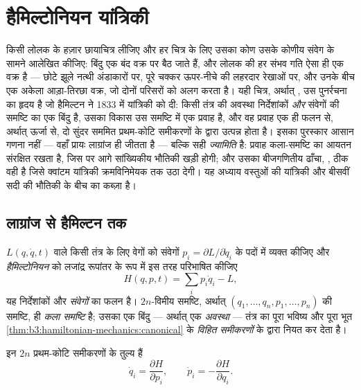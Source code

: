 \chapter{हैमिल्टोनियन यांत्रिकी}\label{ch:b3:hamiltonian-mechanics}

किसी लोलक के हज़ार छायाचित्र लीजिए और हर चित्र के लिए उसका कोण उसके
कोणीय संवेग के सामने आलेखित कीजिए: बिंदु एक बंद वक्र पर बैठ जाते हैं,
और लोलक की हर संभव गति ऐसा ही एक वक्र है --- छोटे झूले नत्थी अंडाकारों
पर, पूरे चक्कर ऊपर-नीचे की लहरदार रेखाओं पर, और उनके बीच एक अकेला
आड़ा-तिरछा वक्र, जो दोनों परिसरों को अलग करता है। यही चित्र, अर्थात्
\emph{}, उस पुनर्रचना का हृदय है जो
हैमिल्टन ने 1833 में यांत्रिकी को दी: किसी तंत्र की अवस्था निर्देशांकों
\emph{और} संवेगों की समष्टि का एक बिंदु है, उसका विकास उस समष्टि में एक
प्रवाह है, और वह प्रवाह एक ही फलन से, अर्थात् ऊर्जा से, दो सुंदर सममित
प्रथम-कोटि समीकरणों के द्वारा उत्पन्न होता है। इसका पुरस्कार आसान गणना
नहीं --- वहाँ प्रायः लाग्रांज ही जीतता है --- बल्कि सही
\emph{ज्यामिति} है: प्रवाह कला-समष्टि का आयतन संरक्षित रखता है, जिस पर
आगे सांख्यिकीय भौतिकी खड़ी होगी; और उसका बीजगणितीय
ढाँचा, , ठीक वही है जिसे क्वांटम यांत्रिकी
क्रमविनिमेयक तक उठा देगी। यह अध्याय वस्तुओं की यांत्रिकी और बीसवीं सदी
की भौतिकी के बीच का कब्ज़ा है।

\section{लाग्रांज से हैमिल्टन तक}

\begin{definition}[हैमिल्टोनियन और विहित समीकरण]\label{def:b3:hamiltonian-mechanics:hamiltonian}
 $L(q, \dot q, t)$ वाले किसी तंत्र के लिए वेगों को
संवेगों $p_i = \partial L/\partial\dot q_i$ के पदों में व्यक्त कीजिए और
\emph{हैमिल्टोनियन} को लजांद्र रूपांतर के रूप में इस तरह परिभाषित कीजिए
\[
H(q, p, t) = \sum_i p_i\dot q_i - L ,
\]
यह निर्देशांकों और \emph{संवेगों} का फलन है।
$2n$-विमीय समष्टि, अर्थात् $(q_1, \dots, q_n, p_1, \dots, p_n)$ की समष्टि,
ही \emph{कला समष्टि} है; उसका एक बिंदु --- अर्थात् एक \emph{अवस्था} ---
तंत्र का पूरा भविष्य और पूरा भूत
\cref{thm:b3:hamiltonian-mechanics:canonical} के \emph{विहित समीकरणों}
के द्वारा नियत कर देता है।
\end{definition}

\begin{theorem}[हैमिल्टन के समीकरण]\label{thm:b3:hamiltonian-mechanics:canonical}
 इन $2n$ प्रथम-कोटि
समीकरणों के तुल्य हैं
\[
\dot q_i = \frac{\partial H}{\partial p_i} , \qquad
\dot p_i = -\frac{\partial H}{\partial q_i} .
\]
\end{theorem}

